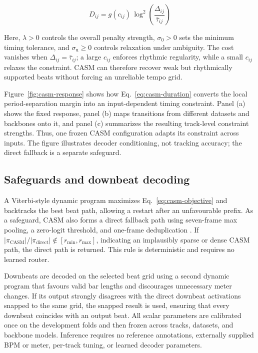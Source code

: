 \documentclass{article}
\newif\ifshowchanges
\newcommand{\rev}[1]{%
  \ifshowchanges
    \textcolor{red}{#1}%
  \else
    #1%
  \fi
}
\begin{document}
\begin{equation}
\rev{
D_{ij}
=
g(c_{ij})\,
\log^2\!\left(
\frac{\Delta_{ij}}{\bar{\tau}_{ij}}
\right)
}
\label{eq:casm-duration}
\end{equation}

\rev{Here, $\lambda>0$ controls the overall penalty strength,
$\sigma_0>0$ sets the minimum timing tolerance, and
$\sigma_{\mathrm u}\geq0$ controls relaxation under ambiguity.
The cost vanishes when $\Delta_{ij}=\bar{\tau}_{ij}$; a large $c_{ij}$
enforces rhythmic regularity, while a small $c_{ij}$ relaxes the
constraint. CASM can therefore recover weak but rhythmically supported
beats without forcing an unreliable tempo grid.}

\rev{Figure~\ref{fig:casm-response} shows how Eq.~\eqref{eq:casm-duration} converts the local period-separation margin into an input-dependent timing constraint. Panel (a) shows the fixed response, panel (b) maps transitions from different datasets and backbones onto it, and panel (c) summarizes the resulting track-level
constraint strengths. Thus, one frozen CASM configuration adapts its
constraint across inputs. The figure illustrates decoder conditioning,
not tracking accuracy; the direct fallback is a separate safeguard.}
\vspace{-3mm}
\rev{\subsection{Safeguards and downbeat decoding}}
\rev{A Viterbi-style dynamic program maximizes
Eq.~\eqref{eq:casm-objective} and backtracks the best beat path, allowing
a restart after an unfavourable prefix. As a safeguard, CASM also forms
a direct fallback path using seven-frame max pooling, a zero-logit
threshold, and one-frame deduplication
\cite{foscarin2024beat}. If
$\lvert\pi_{\mathrm{CASM}}\rvert/
 \lvert\pi_{\mathrm{direct}}\rvert
 \notin[r_{\min},r_{\max}]$,
indicating an implausibly sparse or dense CASM path, the direct path is
returned. This rule is deterministic and requires no learned router.}

\rev{Downbeats are decoded on the selected beat grid using a second
dynamic program that favours valid bar lengths and discourages
unnecessary meter changes. If its output strongly disagrees with the
direct downbeat activations snapped to the same grid, the snapped result
is used, ensuring that every downbeat coincides with an output beat.
All scalar parameters are calibrated once on the development folds and
then frozen across tracks, datasets, and backbone models. Inference
requires no reference annotations, externally supplied BPM or meter,
per-track tuning, or learned decoder parameters.}
\end{document}
